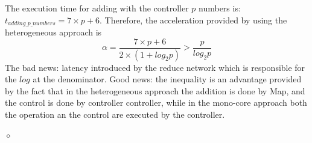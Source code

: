 \begin{exemplu}
{\em 
{}
}
The execution time for adding with the controller $p$ numbers is: $t_{adding\_p\_numbers} = 7 \times p + 6$. Therefore, the acceleration provided by using the heterogeneous approach is $$\alpha = \frac{7 \times p + 6}{2 \times (1 + log_2 p)} > \frac{p}{log_2 p}$$
The bad news: latency introduced by the reduce network which is responsible for the $log$ at the denominator. Good news:  the inequality is an advantage provided by the fact that in the heterogeneous approach the addition is done by Map, and the control is done by controller controller, while in the mono-core approach both the operation an the control are executed by the controller.

$\diamond$
\end{exemplu}



